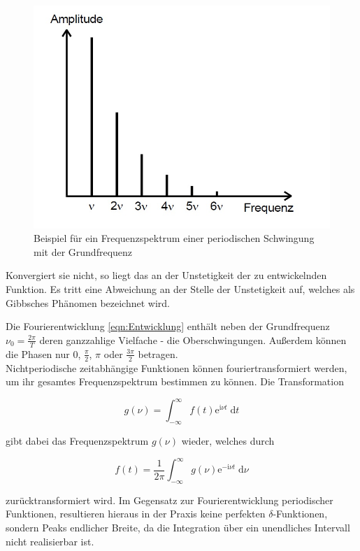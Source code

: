 \begin{figure}
  \centering
  \includegraphics[scale=0.3]{content/Beispielspektrum.jpg}
  \caption{Beispiel für ein Frequenzspektrum einer periodischen Schwingung 
  mit der Grundfrequenz \mu}
  \label{fig:Beispiel}
\end{figure}

Konvergiert sie nicht, so liegt das an der Unstetigkeit der zu entwickelnden Funktion. Es tritt eine Abweichung an der Stelle
der Unstetigkeit auf, welches als Gibbsches Phänomen bezeichnet wird.

Die Fourierentwicklung \eqref{eqn:Entwicklung} enthält neben der Grundfrequenz $\nu_0 = \frac{2 \pi}{T} $ deren
ganzzahlige Vielfache - die Oberschwingungen. Außerdem können die Phasen nur $0$, $\frac{\pi}{2}$, $\pi$ oder
$\frac{3 \pi}{2}$ betragen. \\

Nichtperiodische zeitabhängige Funktionen können fouriertransformiert werden, um ihr gesamtes Frequenzspektrum bestimmen zu können.
Die Transformation

\begin{equation}
    g(\nu) = \int^\infty_{-\infty} f(t) \text{e}^{\text{i} \nu t} \; \text{d} t
\end{equation}

gibt dabei das Frequenzspektrum $g(\nu)$ wieder, welches durch 

\begin{equation}
    f(t) = \frac{1}{2 \pi} \int^\infty_{-\infty} g(\nu) \text{e}^{- \text{i} \nu t} \; \text{d} \nu
\end{equation}

zurücktransformiert wird.
Im Gegensatz zur Fourierentwicklung periodischer Funktionen, resultieren hieraus in der Praxis keine perfekten
$\delta$-Funktionen, sondern Peaks endlicher Breite, da die Integration über ein unendliches Intervall nicht
realisierbar ist.






